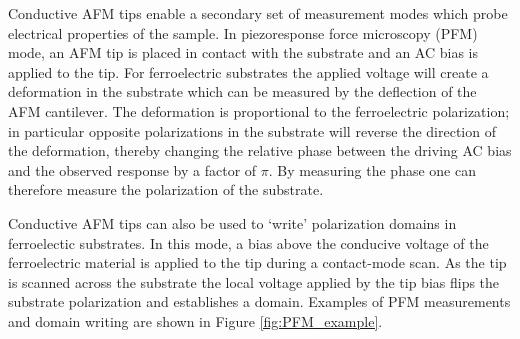 \documentclass[edeposit,fullpage,draftthesis]{uiucthesis2009}
\begin{document}
        Conductive AFM tips enable a secondary set of measurement modes which probe electrical properties of the sample.
        In piezoresponse force microscopy (PFM) mode, an AFM tip is placed in contact with the substrate
        and an AC bias is applied to the tip. For ferroelectric substrates the applied voltage
        will create a deformation in the substrate which can be measured by the deflection of the AFM cantilever. 
        The deformation is proportional to the ferroelectric polarization; in particular opposite polarizations in the substrate
        will reverse the direction of the deformation, thereby changing the relative phase between the driving AC bias
        and the observed response by a factor of $\pi$. By measuring the phase one can therefore measure
        the polarization of the substrate. 
        
        Conductive AFM tips can also be used to `write' polarization domains in ferroelectic substrates.
        In this mode, a bias above the conducive voltage of the ferroelectric material is applied to the tip 
        during a contact-mode scan. As the tip is scanned across the substrate the local voltage applied by the 
        tip bias flips the substrate polarization and establishes a domain.
        Examples of PFM measurements and domain writing are shown in Figure \ref{fig:PFM_example}.
        
\end{document}
